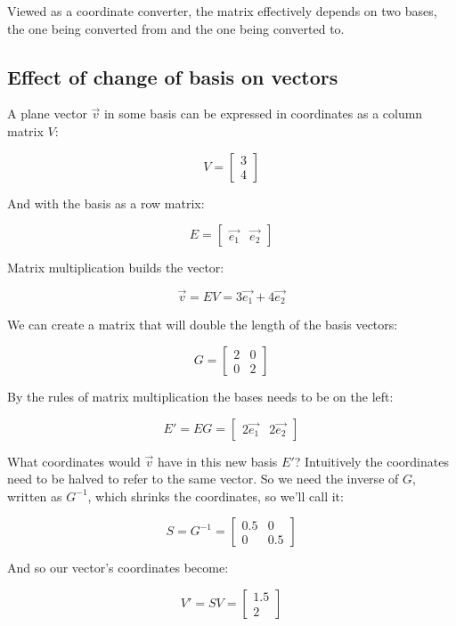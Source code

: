 Viewed as a coordinate converter, the matrix effectively depends on two bases, the one being converted from and the one being converted to.

\subsection{Effect of change of basis on vectors}

A plane vector $\vec{v}$ in some basis can be expressed in coordinates as a column matrix $V$:

$$V = \begin{bmatrix}3 \\ 4\end{bmatrix}$$

And with the basis as a row matrix:

$$E = \begin{bmatrix}\vec{e_1} & \vec{e_2}\end{bmatrix}$$

Matrix multiplication builds the vector:

$$\vec{v} = EV = 3\vec{e_1} + 4\vec{e_2}$$

We can create a matrix that will double the length of the basis vectors:

$$G = \begin{bmatrix}2 & 0 \\ 0 & 2\end{bmatrix}$$

By the rules of matrix multiplication the bases needs to be on the left:

$$E' = EG = \begin{bmatrix}2\vec{e_1} & 2\vec{e_2}\end{bmatrix}$$

What coordinates would $\vec{v}$ have in this new basis $E'$? Intuitively the coordinates need to be halved to refer to the same vector. So we need the inverse of $G$, written as $G^{-1}$, which shrinks the coordinates, so we'll call it:

$$S = G^{-1} = \begin{bmatrix}0.5 & 0 \\ 0 & 0.5\end{bmatrix}$$

And so our vector's coordinates become:

$$V' = SV = \begin{bmatrix}1.5 \\ 2\end{bmatrix}$$


